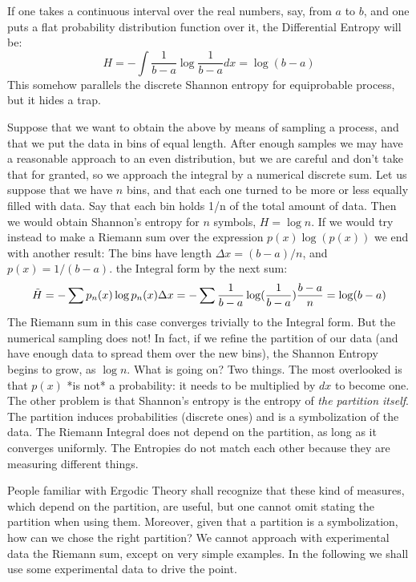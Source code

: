 \documentclass[10pt]{article}
\begin{document}
If one takes a continuous interval over the real numbers, say, from $a$ to $b$, and one puts a flat probability distribution function over it, the Differential Entropy will be:
$$
H=-\int \frac{1}{b-a} \log \frac{1}{b-a} d x = \log (b-a)
$$
This somehow parallels the discrete Shannon entropy for equiprobable process, but it hides a trap.

Suppose that we want to obtain the above by means of sampling a process, and that we put the data in bins of
equal length. After enough samples we may have a reasonable approach to an even distribution, but we are careful
and don't take that for granted, so we approach the integral by a numerical discrete sum. Let us suppose that we have $n$ bins, and that each one turned to be more or less equally filled with data. Say that each bin holds 1/n of the total amount of data. Then we would obtain Shannon's entropy for $n$ symbols, $H=\log n$. If we would try instead to make a Riemann sum over the expression $ p(x) \log (p(x))$ we end with another result: The bins have length $\Delta x= (b-a)/n$, and $p(x)=1/(b-a)$. 
the Integral form by the next sum:
$$
\tilde{H}=-\sum p_n(x) \log p_n(x) \Delta x \\
=-\sum \frac{1}{b-a}\log (\frac{1}{b-a}) \frac{b-a}{n} \\
= \log (b-a)
$$
The Riemann sum in this case converges trivially to the Integral form. But the numerical sampling does not! In fact, if we refine the partition of our data (and have enough data to spread them over the new bins), the Shannon Entropy begins to grow, as $\log n$. What is going on? Two things. The most overlooked is that $p(x)$ *is not* a probability: it needs to be multiplied by $dx$ to become one. The other problem is that  Shannon's entropy is the entropy of \emph{the partition itself}. The partition induces probabilities (discrete ones) and is a symbolization of the data. The Riemann Integral does not depend on the partition, as long as it converges uniformly. The Entropies do not match each other because they are measuring different things.

People familiar with Ergodic Theory shall recognize that these kind of measures, which depend on the partition, are useful, but one cannot omit stating the partition when using them. Moreover, given that a partition is a symbolization, how can we chose the right partition? We cannot approach with experimental data the Riemann sum, except on very simple examples. 
In the following we shall use some experimental data
to drive the point.
\end{document}
